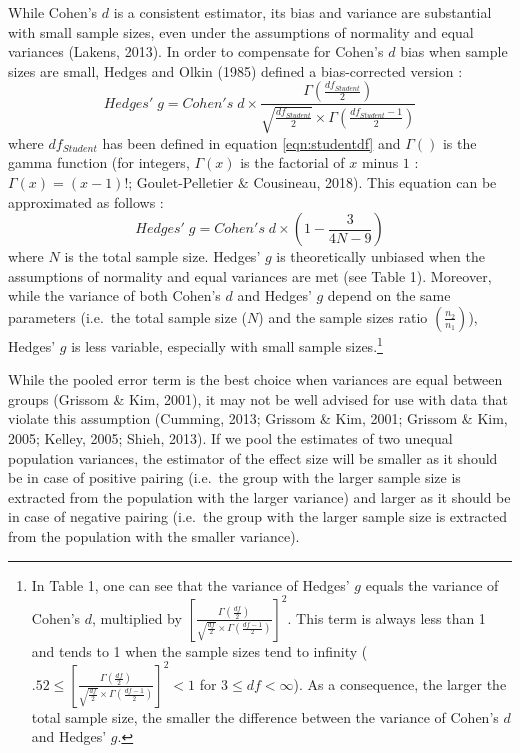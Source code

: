 \documentclass[
  english,
  man,floatsintext]{apa6}
\begin{document}
While Cohen's \(d\) is a consistent estimator, its bias and variance are substantial with small sample sizes, even under the assumptions of normality and equal variances (Lakens, 2013). In order to compensate for Cohen's \(d\) bias when sample sizes are small, Hedges and Olkin (1985) defined a bias-corrected version :
\begin{equation*} 
Hedges' \; g = Cohen's \; d \times \frac{\Gamma(\frac{df_{Student}}{2})}{\sqrt{\frac{df_{Student}}{2}} \times \Gamma(\frac{df_{Student}-1}{2})}
\label{eqn:Hedgesgs}
\end{equation*}
where \(df_{Student}\) has been defined in equation \ref{eqn:studentdf} and \(\Gamma()\) is the gamma function (for integers, \(\Gamma(x)\) is the factorial of \(x\) minus \(1\) : \(\Gamma(x)=(x-1)!\); Goulet-Pelletier \(\&\) Cousineau, 2018). This equation can be approximated as follows :
\begin{equation*} 
Hedges' \; g = Cohen's \; d \times \left( 1- \frac{3}{4N -9} \right)
\label{eqn:Hedgesgsapprox}
\end{equation*}
where \(N\) is the total sample size. Hedges' \(g\) is theoretically unbiased when the assumptions of normality and equal variances are met (see Table 1). Moreover, while the variance of both Cohen's \(d\) and Hedges' \(g\) depend on the same parameters (i.e.~the total sample size (\(N\)) and the sample sizes ratio \(\left(\frac{n_2}{n_1}\right)\)), Hedges' \(g\) is less variable, especially with small sample sizes.\footnote{In Table 1, one can see that the variance of Hedges' $g$ equals the variance of Cohen's $d$, multiplied by $\left[\frac{\Gamma(\frac{df}{2})}{\sqrt{\frac{df}{2}} \times \Gamma(\frac{df-1}{2})} \right] ^2$. This term is always less than 1 and tends to 1 when the sample sizes tend to infinity ($.52 \le \left[\frac{\Gamma(\frac{df}{2})}{\sqrt{\frac{df}{2}} \times \Gamma(\frac{df-1}{2})} \right] ^2 < 1$ for $3 \le df < \infty$). As a consequence, the larger the total sample size, the smaller the difference between the variance of Cohen's $d$ and Hedges' $g$.}

While the pooled error term is the best choice when variances are equal between groups (Grissom \& Kim, 2001), it may not be well advised for use with data that violate this assumption (Cumming, 2013; Grissom \& Kim, 2001; Grissom \& Kim, 2005; Kelley, 2005; Shieh, 2013). If we pool the estimates of two unequal population variances, the estimator of the effect size will be smaller as it should be in case of positive pairing (i.e.~the group with the larger sample size is extracted from the population with the larger variance) and larger as it should be in case of negative pairing (i.e.~the group with the larger sample size is extracted from the population with the smaller variance).
\end{document}
